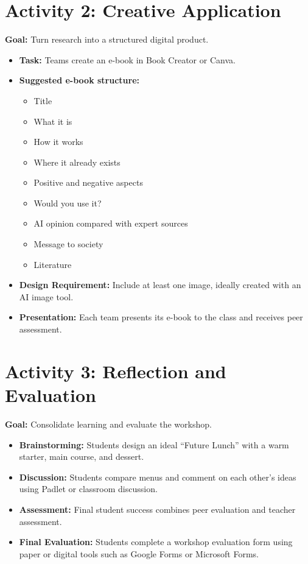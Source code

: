 \documentclass[11pt, a4paper]{article}
\begin{document}
\section{Activity 2: Creative Application}
\textbf{Goal:} Turn research into a structured digital product.
\begin{itemize}
    \item \textbf{Task:} Teams create an e-book in Book Creator or Canva.
    \item \textbf{Suggested e-book structure:}
    \begin{itemize}
        \item Title
        \item What it is
        \item How it works
        \item Where it already exists
        \item Positive and negative aspects
        \item Would you use it?
        \item AI opinion compared with expert sources
        \item Message to society
        \item Literature
    \end{itemize}
    \item \textbf{Design Requirement:} Include at least one image, ideally created with an AI image tool.
    \item \textbf{Presentation:} Each team presents its e-book to the class and receives peer assessment.
\end{itemize}

\section{Activity 3: Reflection and Evaluation}
\textbf{Goal:} Consolidate learning and evaluate the workshop.
\begin{itemize}
    \item \textbf{Brainstorming:} Students design an ideal ``Future Lunch'' with a warm starter, main course, and dessert.
    \item \textbf{Discussion:} Students compare menus and comment on each other's ideas using Padlet or classroom discussion.
    \item \textbf{Assessment:} Final student success combines peer evaluation and teacher assessment.
    \item \textbf{Final Evaluation:} Students complete a workshop evaluation form using paper or digital tools such as Google Forms or Microsoft Forms.
\end{itemize}
\end{document}
